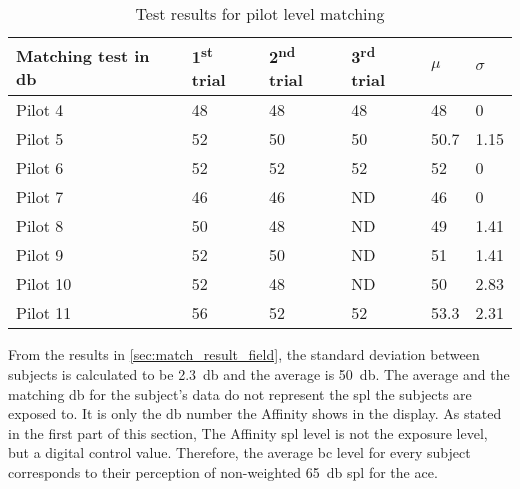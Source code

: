\begin{table}[H]
\centering
\caption{Test results for pilot level matching}
\begin{tabular}{l|lll|ll}
Matching test in \si{\decibel}   & 1\textsuperscript{st} trial & 2\textsuperscript{nd} trial & 3\textsuperscript{rd} trial & $\mu$ & $\sigma$ \\ \hline
Pilot 4  & 48          & 48           & 48          & 48          & 0                  \\
Pilot 5  & 52          & 50           & 50          & 50.7        & 1.15               \\
Pilot 6  & 52          & 52           & 52          & 52          & 0                  \\
Pilot 7  & 46          & 46           & ND          & 46          & 0                  \\
Pilot 8  & 50          & 48           & ND          & 49          & 1.41               \\
Pilot 9  & 52          & 50           & ND          & 51          & 1.41               \\
Pilot 10  & 52          & 48           & ND          & 50          & 2.83               \\
Pilot 11  & 56          & 52           & 52          & 53.3        & 2.31             
\end{tabular}
\label{sec:match_result_field}
\end{table}

From the results in \autoref{sec:match_result_field}, the standard deviation between subjects is calculated to be \SI{2.3}{\decibel} and the average is \SI{50}{\decibel}. The average and the matching \si{\decibel} for the subject's data do not represent the \gls{spl} the subjects are exposed to. It is only the \si{\decibel} number the Affinity shows in the display. As stated in the first part of this section, The Affinity  \gls{spl} level is not the exposure level, but a digital control value. Therefore, the average \gls{bc} level for every subject corresponds to their perception of non-weighted \SI{65}{\decibel} \gls{spl}  for the \gls{ace}. 

